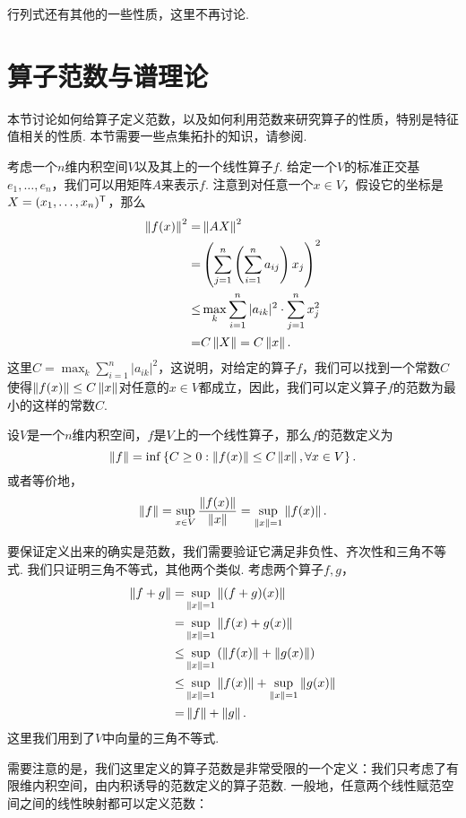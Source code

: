 行列式还有其他的一些性质，这里不再讨论. 

\section{算子范数与谱理论}\label{sec:operator-norm}

本节讨论如何给算子定义范数，以及如何利用范数来研究算子的性质，特别是特征值相关的性质. 本节需要一些点集拓扑的知识，请参阅.

考虑一个$n$维内积空间$V$以及其上的一个线性算子$f$. 给定一个$V$的标准正交基$e_1,\dots,e_n$，我们可以用矩阵$A$来表示$f$. 注意到对任意一个$x\in V$，假设它的坐标是$X=(x_1,\dots,x_n)^{\mathsf{T}}$，那么
\begin{align*}
    \left\|f(x)\right\|^2=&\left\|AX\right\|^2\\
    =&\left(\sum_{j=1}^n\left(\sum_{i=1}^na_{ij}\right)x_j\right)^2\\
    \leq &\max_{k}\sum_{i=1}^n|a_{ik}|^2\cdot\sum_{j=1}^n x_j^2\\
    =&C\left\|X\right\|=C\left\|x\right\|.
\end{align*}
这里$C=\max_{k}\sum_{i=1}^n|a_{ik}|^2$，这说明，对给定的算子$f$，我们可以找到一个常数$C$使得$\left\|f(x)\right\|\leq C\left\|x\right\|$对任意的$x\in V$都成立，因此，我们可以定义算子$f$的范数为最小的这样的常数$C$. 

\begin{definition}[算子范数]
    设$V$是一个$n$维内积空间，$f$是$V$上的一个线性算子，那么$f$的范数定义为
    \[\left\|f\right\|=\inf\left\{C\geq 0:\left\|f(x)\right\|\leq C\left\|x\right\|,\forall x\in V\right\}.\]
或者等价地，
\[\left\|f\right\|=\sup_{x\in V}\frac{\left\|f(x)\right\|}{\left\|x\right\|}=\sup_{\left\|x\right\|=1}\left\|f(x)\right\|.\]
\end{definition}

要保证定义出来的确实是范数，我们需要验证它满足非负性、齐次性和三角不等式. 我们只证明三角不等式，其他两个类似. 考虑两个算子$f,g$，
\begin{align*}
    \left\|f+g\right\|=&\sup_{\left\|x\right\|=1}\left\|(f+g)(x)\right\|\\
    =&\sup_{\left\|x\right\|=1}\left\|f(x)+g(x)\right\|\\
    \leq&\sup_{\left\|x\right\|=1}\left(\left\|f(x)\right\|+\left\|g(x)\right\|\right)\\
    \leq&\sup_{\left\|x\right\|=1}\left\|f(x)\right\|+\sup_{\left\|x\right\|=1}\left\|g(x)\right\|\\
    =&\left\|f\right\|+\left\|g\right\|.
\end{align*}
这里我们用到了$V$中向量的三角不等式. 

需要注意的是，我们这里定义的算子范数是非常受限的一个定义：我们只考虑了有限维内积空间，由内积诱导的范数定义的算子范数. 一般地，任意两个线性赋范空间之间的线性映射都可以定义范数：

